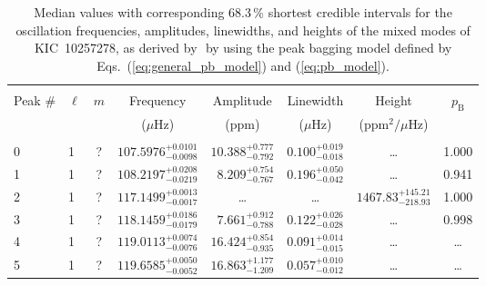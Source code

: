 \begin{table*}[!]
\caption{Median values with corresponding 68.3\,\% shortest credible intervals for the oscillation frequencies, amplitudes, linewidths, and heights of the mixed modes of KIC~10257278, as derived by \diamonds\,\,by using the peak bagging model defined by Eqs.~(\ref{eq:general_pb_model}) and (\ref{eq:pb_model}).}
\label{tab:10257278m}
\centering
\begin{tabular}{llcrrlrc}
\hline\hline
\\[-8pt]      
Peak \# & $\ell$ & $m$ & \multicolumn{1}{c}{Frequency} & \multicolumn{1}{c}{Amplitude} & \multicolumn{1}{c}{Linewidth} & \multicolumn{1}{c}{Height}& $p_\mathrm{B}$\\
 & & & \multicolumn{1}{c}{($\mu$Hz)} & \multicolumn{1}{c}{(ppm)} & \multicolumn{1}{c}{($\mu$Hz)} & \multicolumn{1}{c}{(ppm$^2/\mu$Hz)}\\
\hline \\[-8pt]
0 & 1 & ? & $    107.5976_{-      0.0098}^{+      0.0101}$ & $      10.388_{-       0.792}^{+       0.777}$ & $       0.100_{-       0.018}^{+       0.019}$ & \multicolumn{1}{c}{\dots} & 1.000\\[1pt]
1 & 1 & ? & $    108.2197_{-      0.0219}^{+      0.0208}$ & $       8.209_{-       0.767}^{+       0.754}$ & $       0.196_{-       0.042}^{+       0.050}$ & \multicolumn{1}{c}{\dots} & 0.941\\[1pt]

2 & 1 & ? & $    117.1499_{-      0.0017}^{+      0.0013}$ & \multicolumn{1}{c}{\dots} & \multicolumn{1}{c}{\dots} & $     1467.83_{-      218.93}^{+      145.21}$ & 1.000 \\[1pt]
3 & 1 & ? & $    118.1459_{-      0.0179}^{+      0.0186}$ & $       7.661_{-       0.788}^{+       0.912}$ & $       0.122_{-       0.028}^{+       0.026}$ & \multicolumn{1}{c}{\dots} & 0.998\\[1pt]
4 & 1 & ? & $    119.0113_{-      0.0076}^{+      0.0074}$ & $      16.424_{-       0.935}^{+       0.854}$ & $       0.091_{-       0.015}^{+       0.014}$ & \multicolumn{1}{c}{\dots} & \dots\\[1pt]
5 & 1 & ? & $    119.6585_{-      0.0052}^{+      0.0050}$ & $      16.863_{-       1.209}^{+       1.177}$ & $       0.057_{-       0.012}^{+       0.010}$ & \multicolumn{1}{c}{\dots} &\dots\\[1pt]


\end{tabular}
\end{table*}
